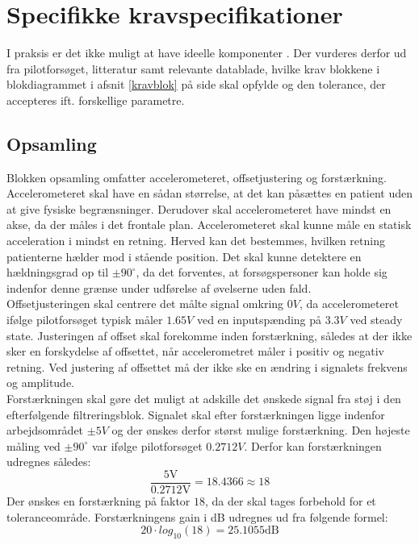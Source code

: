 \section{Specifikke kravspecifikationer}
I praksis er det ikke muligt at have ideelle komponenter \cite{Nilsson2011}. Der vurderes derfor ud fra pilotforsøget, litteratur samt relevante datablade, hvilke krav blokkene i blokdiagrammet i afsnit \ref{kravblok} på side \pageref{kravblok} skal opfylde og den tolerance, der accepteres ift. forskellige parametre.

\subsection{Opsamling}\label{OpsamlingsAfs}
Blokken opsamling omfatter accelerometeret, offsetjustering og forstærkning. Accelerometeret skal have en sådan størrelse, at det kan påsættes en patient uden at give fysiske begrænsninger. Derudover skal accelerometeret have mindst en akse, da der måles i det frontale plan. Accelerometeret skal kunne måle en statisk acceleration i mindst en retning. Herved kan det bestemmes, hvilken retning patienterne hælder mod i stående position. Det skal kunne detektere en hældningsgrad op til $\pm90^{\circ}$, da det forventes, at forsøgspersoner kan holde sig indenfor denne grænse under udførelse af øvelserne uden fald. \\
Offsetjusteringen skal centrere det målte signal omkring $0V$, da accelerometeret ifølge pilotforsøget typisk måler $1.65V$ ved en inputspænding på $3.3V$ ved steady state. Justeringen af offset skal forekomme inden forstærkning, således at der ikke sker en forskydelse af offsettet, når accelerometret måler i positiv og negativ retning. Ved justering af offsettet må der ikke ske en ændring i signalets frekvens og amplitude. \\
Forstærkningen skal gøre det muligt at adskille det ønskede signal fra støj i den efterfølgende filtreringsblok. Signalet skal efter forstærkningen ligge indenfor arbejdsområdet $\pm5V$ og der ønskes derfor størst mulige forstærkning. Den højeste måling ved $\pm90^{\circ}$ var ifølge pilotforsøget $0.2712V.$ Derfor kan forstærkningen udregnes således:
\begin{equation}
\dfrac{5\text{V}}{0.2712\text{V}} = 18.4366 \approx 18
\end{equation}
\noindent Der ønskes en forstærkning på faktor $18$, da der skal tages forbehold for et toleranceområde. Forstærkningens gain i dB udregnes ud fra følgende formel: 
\begin{equation}
20 \cdot log_{10} (18) = 25.1055\text{dB}
\end{equation} 

